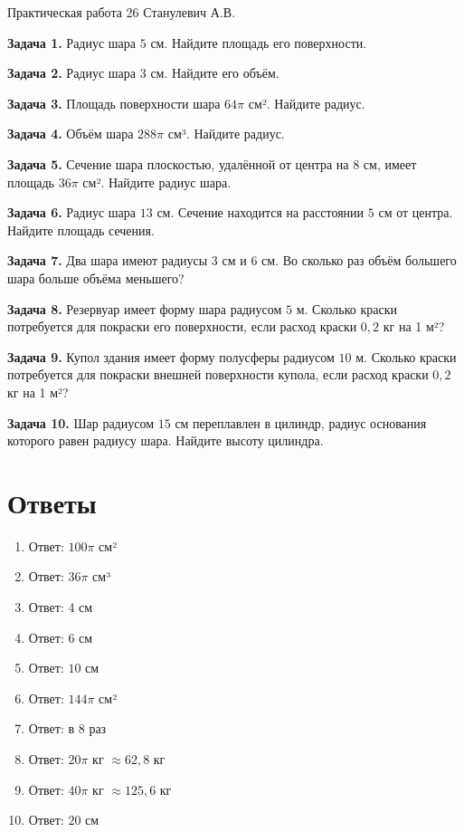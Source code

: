 \documentclass{umk-matematika}
\begin{document}
\maketitlepage
    {Практическая работа 26}
    {}
    {Станулевич А.В.}

\textbf{Задача 1.} Радиус шара $5$ см. Найдите площадь его поверхности.\par\vspace{10pt}
\textbf{Задача 2.} Радиус шара $3$ см. Найдите его объём.\par\vspace{10pt}
\textbf{Задача 3.} Площадь поверхности шара $64\pi$ см². Найдите радиус.\par\vspace{10pt}
\textbf{Задача 4.} Объём шара $288\pi$ см³. Найдите радиус.\par\vspace{10pt}
\textbf{Задача 5.} Сечение шара плоскостью, удалённой от центра на $8$ см, имеет площадь $36\pi$ см². Найдите радиус шара.\par\vspace{10pt}
\textbf{Задача 6.} Радиус шара $13$ см. Сечение находится на расстоянии $5$ см от центра. Найдите площадь сечения.\par\vspace{10pt}
\textbf{Задача 7.} Два шара имеют радиусы $3$ см и $6$ см. Во сколько раз объём большего шара больше объёма меньшего?\par\vspace{10pt}
\textbf{Задача 8.} Резервуар имеет форму шара радиусом $5$ м. Сколько краски потребуется для покраски его поверхности, если расход краски $0{,}2$ кг на 1 м²?\par\vspace{10pt}
\textbf{Задача 9.} Купол здания имеет форму полусферы радиусом $10$ м. Сколько краски потребуется для покраски внешней поверхности купола, если расход краски $0{,}2$ кг на 1 м²?\par\vspace{10pt}
\textbf{Задача 10.} Шар радиусом $15$ см переплавлен в цилиндр, радиус основания которого равен радиусу шара. Найдите высоту цилиндра.\par\vspace{10pt}
\newpage
\section*{Ответы}

\begin{enumerate}
  \item Ответ: $100\pi$ см²
  \item Ответ: $36\pi$ см³
  \item Ответ: $4$ см
  \item Ответ: $6$ см
  \item Ответ: $10$ см
  \item Ответ: $144\pi$ см²
  \item Ответ: в $8$ раз
  \item Ответ: $20\pi$ кг $\approx 62{,}8$ кг
  \item Ответ: $40\pi$ кг $\approx 125{,}6$ кг
  \item Ответ: $20$ см
\end{enumerate}
\end{document}
